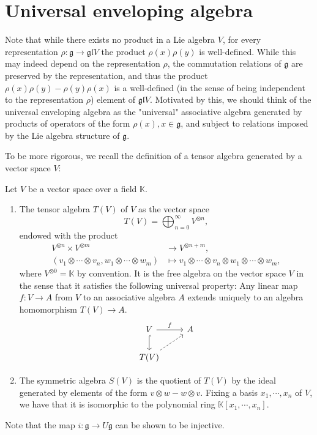 \documentclass{report}
\begin{document}
\section{Universal enveloping algebra}
Note that while there exists no product in a Lie algebra $V$, for every representation $\rho: \mathfrak g \to \mathfrak{gl}{V}$ the product $\rho(x) \rho(y)$ is well-defined.
While this may indeed depend on the representation $\rho$, the commutation relations of $\mathfrak g$ are preserved by the representation, and thus the product $\rho(x) \rho(y) - \rho(y) \rho(x)$ is a well-defined (in the sense of being independent to the representation $\rho$) element of $\mathfrak{gl}{V}$.
Motivated by this, we should think of the universal enveloping algebra as the "universal" associative algebra generated by products of operators of the form $\rho(x), x \in \mathfrak g$, and subject to relations imposed by the Lie algebra structure of $\mathfrak g$.

To be more rigorous, we recall the definition of a tensor algebra generated by a vector space $V$:
\begin{definition}
    Let $V$ be a vector space over a field $\mathbb K$.
    \begin{enumerate}[label = (\roman*)]
        \item 
        The tensor algebra $T(V)$ of $V$ as the vector space
    \[
    T(V) = \bigoplus_{n=0}^\infty V^{\otimes n},
    \]
    endowed with the product
    \begin{align*}
        V^{\otimes n} \times V^{\otimes m} &\to V^{\otimes n+m},\\
        (v_1 \otimes \cdots \otimes v_n, w_1 \otimes \cdots \otimes w_m) &\mapsto v_1 \otimes \cdots \otimes v_n \otimes w_1 \otimes \cdots \otimes w_m,
    \end{align*}
    where $V^{\otimes 0} = \mathbb K$ by convention.
    It is the free algebra on the vector space $V$ in the sense that it satisfies the following universal property:
    Any linear map $f: V \to A$ from $V$ to an associative algebra $A$ extends uniquely to an algebra homomorphism $T(V) \to A$.
    \[
    \begin{tikzcd}
        V \arrow[r, "f"] \arrow[d, hook] & A\\
        T(V) \arrow[ur, dashed]
    \end{tikzcd}
    \]
    \item
    The symmetric algebra $S(V)$ is the quotient of $T(V)$ by the ideal generated by elements of the form $v \otimes w - w \otimes v$.
    Fixing a basis $x_1, \cdots, x_n$ of $V$, we have that it is isomorphic to the polynomial ring $\mathbb K[x_1, \cdots, x_n]$.
    \end{enumerate}
\end{definition}
Note that the map $i: \mathfrak g \to U \mathfrak g$ can be shown to be injective.
\end{document}
